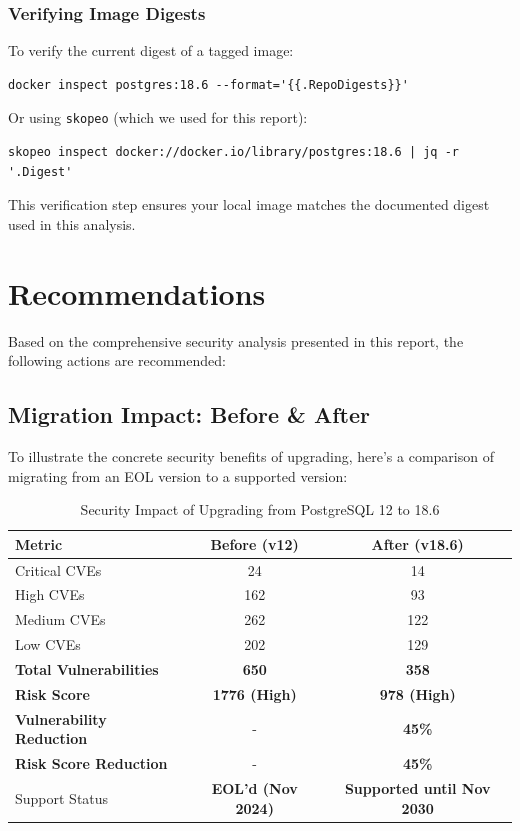 \documentclass[11pt, a4paper]{article}
\begin{document}
\subsubsection{Verifying Image Digests}

To verify the current digest of a tagged image:

\begin{verbatim}
docker inspect postgres:18.6 --format='{{.RepoDigests}}'
\end{verbatim}

Or using \texttt{skopeo} (which we used for this report):

\begin{verbatim}
skopeo inspect docker://docker.io/library/postgres:18.6 | jq -r '.Digest'
\end{verbatim}

This verification step ensures your local image matches the documented digest used in this analysis.


\section{Recommendations}
\label{sec:recommendations}

Based on the comprehensive security analysis presented in this report, the following actions are recommended:

\subsection{Migration Impact: Before \& After}

To illustrate the concrete security benefits of upgrading, here's a comparison of migrating from an EOL version to a supported version:

\begin{table}[htbp]
\centering
\caption{Security Impact of Upgrading from PostgreSQL 12 to 18.6}
\label{tab:before-after}
\begin{tabular}{@{}lcc@{}}
\toprule
\textbf{Metric} & \textbf{Before (v12)} & \textbf{After (v18.6)} \\ \midrule
\rowcolor{lightred} Critical CVEs & 24 & 14 \\
\rowcolor{lightorange} High CVEs & 162 & 93 \\
\rowcolor{lightorange} Medium CVEs & 262 & 122 \\
\rowcolor{lightgreen} Low CVEs & 202 & 129 \\
\midrule
\textbf{Total Vulnerabilities} & \textbf{650} & \textbf{358} \\
\rowcolor{lightorange} \textbf{Risk Score} & \textbf{1776 (High)} & \textbf{978 (High)} \\
\rowcolor{lightgreen} \textbf{Vulnerability Reduction} & - & \textbf{45\%} \\
\rowcolor{lightgreen} \textbf{Risk Score Reduction} & - & \textbf{45\%} \\
\rowcolor{lightgreen} Support Status & \textbf{EOL'd (Nov 2024)} & \textbf{Supported until Nov 2030} \\
\bottomrule
\end{tabular}
\end{table}
\end{document}
